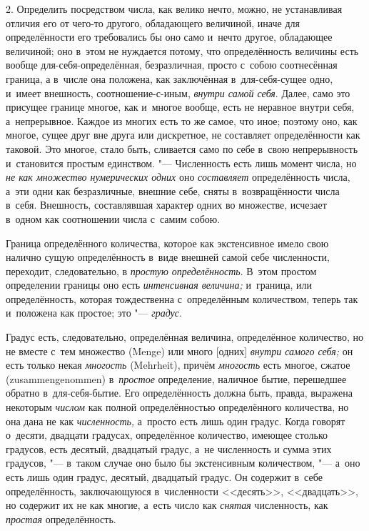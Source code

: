 2. Определить посредством числа, как велико нечто, можно, не устанавливая
отличия его от чего-то другого, обладающего величиной, иначе для определённости
его требовались бы оно само и~нечто другое, обладающее величиной; оно в~этом не
нуждается потому, что определённость величины есть вообще
для-себя-определённая, безразличная, просто с~собою соотнесённая граница, а
в~числе она положена, как заключённая в~для-себя-сущее одно, и~имеет внешность,
соотношение-с-иным, {\em внутри самой себя}. Далее, само это присущее границе
многое, как и~многое вообще, есть не неравное внутри себя, а~непрерывное.
Каждое из многих есть то же самое, что иное; поэтому оно, как многое, сущее
друг вне друга или дискретное, не составляет определённости как таковой. Это
многое, стало быть, сливается само по себе в~свою непрерывность и~становится
простым единством. "--- Численность есть лишь момент числа, но {\em не как
множество нумерических одних} оно {\em составляет} определённость числа, а~эти
одни как безразличные, внешние себе, сняты в~возвращённости числа в~себя.
Внешность, составлявшая характер одних во множестве, исчезает в~одном как
соотношении числа с~самим собою.

Граница определённого количества, которое как экстенсивное имело свою налично
сущую определённость в~виде внешней самой себе численности, переходит,
следовательно, в {\em простую определённость}. В~этом простом определении
границы оно есть {\em интенсивная величина;} и~граница, или определённость,
которая тождественна с~определённым количеством, теперь так и~положена как
простое; это "--- {\em градус}.

Градус есть, следовательно, определённая величина, определённое количество, но
не вместе с~тем множество (Menge) или много [одних] {\em внутри самого себя;}
он есть только некая {\em многость} (Mehrheit), причём {\em многость} есть
многое, сжатое (zusammen\-genommen) в~{\em простое} определение, наличное бытие,
перешедшее обратно в~для-себя-бытие. Его определённость должна быть, правда,
выражена некоторым {\em числом} как полной определённостью определённого
количества, но она дана не как {\em численность,} а~просто есть лишь один
градус. Когда говорят о~десяти, двадцати градусах, определённое количество,
имеющее столько градусов, есть десятый, двадцатый градус, а~не численность и
сумма этих градусов, "--- в~таком случае оно было бы экстенсивным количеством,
"--- а~оно есть лишь один градус, десятый, двадцатый градус. Он содержит в~себе
определённость, заключающуюся в~численности <<десять>>, <<двадцать>>, но
содержит их не как многие, а~есть число как {\em снятая} численность, как
{\em простая} определённость.


